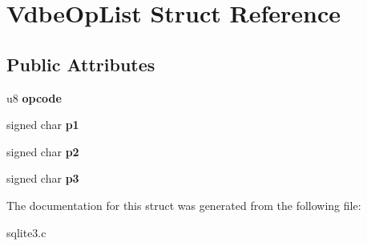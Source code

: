 \hypertarget{structVdbeOpList}{}\section{Vdbe\+Op\+List Struct Reference}
\label{structVdbeOpList}
\subsection*{Public Attributes}
\begin{DoxyCompactItemize}
\item 
u8 {\bfseries opcode}\hypertarget{structVdbeOpList_a9c839a619aed99f91cb5e226487be7be}{}\label{structVdbeOpList_a9c839a619aed99f91cb5e226487be7be}

\item 
signed char {\bfseries p1}\hypertarget{structVdbeOpList_a68641ef4313dfdfafe45b75203c49d5a}{}\label{structVdbeOpList_a68641ef4313dfdfafe45b75203c49d5a}

\item 
signed char {\bfseries p2}\hypertarget{structVdbeOpList_a8493431402f7f91cea81c00e311dc4e1}{}\label{structVdbeOpList_a8493431402f7f91cea81c00e311dc4e1}

\item 
signed char {\bfseries p3}\hypertarget{structVdbeOpList_a584cdaa02042fd5d1bc8cffbdfd9441d}{}\label{structVdbeOpList_a584cdaa02042fd5d1bc8cffbdfd9441d}

\end{DoxyCompactItemize}


The documentation for this struct was generated from the following file\+:\begin{DoxyCompactItemize}
\item 
sqlite3.\+c\end{DoxyCompactItemize}

